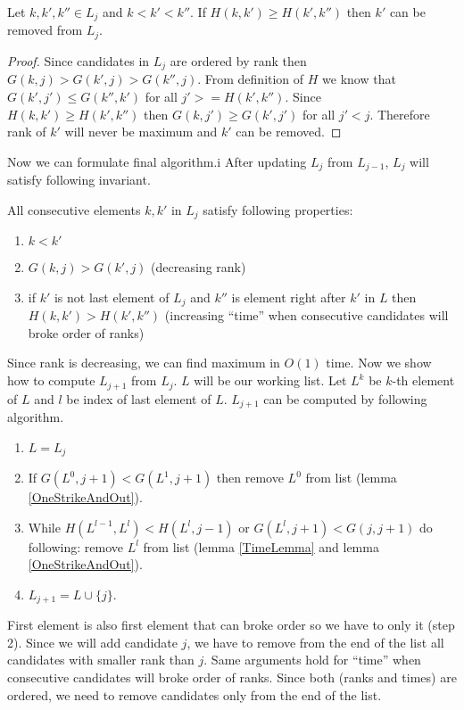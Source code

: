 \begin{lemma}\label{TimeLemma}
Let $k,k',k''\in L_j$ and $k<k'<k''$. If $H(k,k')\geq H(k',k'')$ then $k'$ can be
removed from $L_j$.
\end{lemma}

\begin{proof}
Since candidates in $L_j$ are ordered by rank then $G(k,j)>G(k',j)>G(k'',j)$.
From definition of $H$ we know that 
$G(k',j')\leq G(k'',k')$ for  all $j'>=H(k',k'')$. Since
$H(k,k')\geq H(k',k'')$ then $G(k,j')\geq G(k',j')$ for all $j'<j$. Therefore rank
of $k'$ will never be maximum and $k'$ can be removed.

\end{proof}

Now we can formulate final algorithm.i After updating $L_j$ from $L_{j-1}$,
$L_j$ will satisfy following invariant.
\begin{invariant}\label{LogGapInvariant}
All consecutive elements $k,k'$ in $L_j$ satisfy following properties:
\begin{enumerate}
\item $k<k'$
\item $G(k,j)>G(k',j)$ (decreasing rank)
\item if $k'$ is not last element of $L_j$ and $k''$ is element right after $k'$
in $L$ then $H(k,k')> H(k',k'')$ (increasing ``time'' when consecutive
candidates will broke order of ranks)
\end{enumerate}
\end{invariant}

Since rank is decreasing, we can find maximum in $O(1)$ time. Now we show how
to compute $L_{j+1}$ from $L_j$. $L$ will be our working list.
Let $L^k$ be $k$-th element of $L$ and $l$ be index of last element of $L$. 
$L_{j+1}$ can be computed by following algorithm.
\begin{enumerate}
\item $L=L_j$
\item If $G(L^0,j+1)< G(L^1,j+1)$ then remove $L^0$ from
list (lemma \ref{OneStrikeAndOut}).
\item While $H(L^{l-1},L^{l})<H(L^l,j-1)$ or $G(L^l,j+1)<G(j,j+1)$ do following: remove $L^l$ from list (lemma
\ref{TimeLemma} and lemma \ref{OneStrikeAndOut}).
\item $L_{j+1}=L\cup\{j\}$.
\end{enumerate}
First element is also first element that can broke order so we have to only it
(step 2). Since we will add candidate $j$, we have to remove from the end of the
list all candidates with smaller rank than $j$. Same arguments hold for ``time''
when consecutive candidates will broke order of ranks. Since both (ranks and
times) are ordered, we need to remove candidates only from the end of the list.

